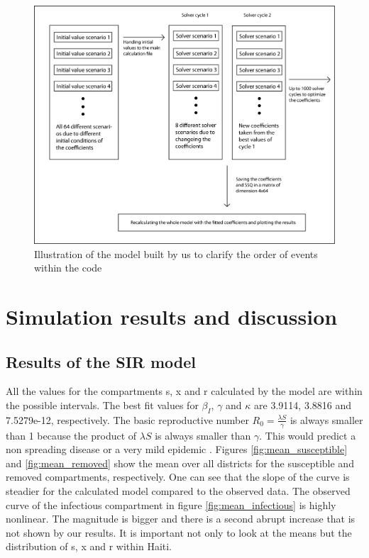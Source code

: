 \documentclass[11pt]{article}
\begin{document}
\begin{center}
\begin{figure}
\includegraphics[scale=.6]{Bilder/Matlab_program.png}
\caption{Illustration of the model built by us to clarify the order of events within the code}
\label{pic:sir_flow_our}
\end{figure}
\end{center}




\newpage
\section{Simulation results and discussion}
\subsection{Results of the SIR model}
All the values for the compartments s, x and r calculated by the model are within the possible intervals. The best fit values for $\beta_{I}$, $\gamma$ and $\kappa$ are 3.9114, 3.8816 and 7.5279e-12, respectively. The basic reproductive number $R_{0} = \frac{\lambda S}{\gamma}$ is always smaller than 1 because the product of $\lambda S$ is always smaller than $\gamma$. This would predict a non spreading disease or a very mild epidemic \cite{kermack:1927}. Figures \ref{fig:mean_susceptible} and \ref{fig:mean_removed} show the mean over all districts for the susceptible and removed compartments, respectively. One can see that the slope of the curve is steadier for the calculated model compared to the observed data. The observed curve of the infectious compartment in figure \ref{fig:mean_infectious} is highly nonlinear. The magnitude is bigger and there is a second abrupt increase that is not shown by our results. It is important not only to look at the means but the distribution of s, x and r within Haiti.\\
\end{document}
